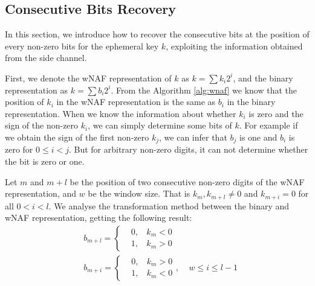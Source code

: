 






\subsection{Consecutive Bits Recovery}
\label{data_proc1}
In this section, we introduce how to recover the consecutive bits at the position of every non-zero bits for the ephemeral key $k$, exploiting the information obtained from the side channel.

First, we denote the wNAF representation of $k$ as $k = \sum{k_{i}2^{i}}$,
 and the binary representation as $k = \sum{b_{i}2^{i}}$.
From the Algorithm \ref{alg:wnaf} we know that the position of $k_i$ in the wNAF representation is the same as $b_i$ in the binary representation.
 When we know the information about whether $k_i$ is zero and the sign of the non-zero $k_i$, we can simply determine some bits of $k$.
 For example if we obtain the sign of the first non-zero $k_j$, we can infer that $b_j$ is one and $b_i$ is zero for $0\leq i<j$.
 But for arbitrary non-zero digits, it can not determine whether the bit is zero or one.

 Let $m$ and $m + l$ be the position of two consecutive non-zero digits of the wNAF representation, and $w$ be the window size.
 That is $k_m, k_{m+l} \neq 0$ and $k_{m+i} = 0$ for all $0 < i < l$.
 We analyse the transformation method between the binary and wNAF representation, getting the following result:
 \begin{align}
 &b_{m+l} = \left\{
 \begin{aligned}
 	&0,\,\;\ \   k_m < 0 \\
 	&1,\,\;\ \   k_m > 0
 \end{aligned}
 \right.   \\
 &b_{m+i} = \left\{
 \begin{aligned}
 	&0,\,\;\ \   k_m > 0 \\
 	&1,\,\;\ \   k_m < 0
 \end{aligned}
 \right.
 ,\ \ \ \ \  w \leq i \leq l-1
 \end{align}

